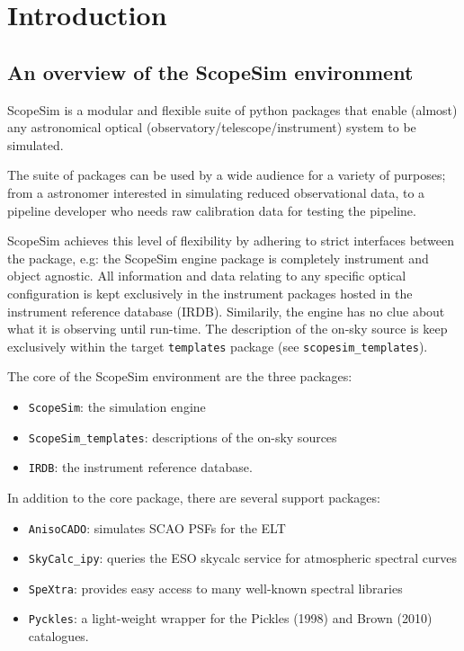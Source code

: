 

\section{Introduction%
  \label{introduction}%
}


\subsection{An overview of the ScopeSim environment%
  \label{an-overview-of-the-scopesim-environment}%
}

ScopeSim is a modular and flexible suite of python packages that enable (almost) any astronomical optical (observatory/telescope/instrument) system to be simulated.

The suite of packages can be used by a wide audience for a variety of purposes; from a astronomer interested in simulating reduced observational data, to a pipeline developer who needs raw calibration data for testing the pipeline.


ScopeSim achieves this level of flexibility by adhering to strict interfaces between the package, e.g: the ScopeSim engine package is completely instrument and object agnostic.
All information and data relating to any specific optical configuration is kept exclusively in the instrument packages hosted in the instrument reference database (IRDB).
Similarily, the engine has no clue about what it is observing until run-time.
The description of the on-sky source is keep exclusively within the target \texttt{templates} package (see \texttt{scopesim\_templates}).

The core of the ScopeSim environment are the three packages:

\begin{itemize}
\item \texttt{ScopeSim}: the simulation engine

\item \texttt{ScopeSim\_templates}: descriptions of the on-sky sources

\item \texttt{IRDB}: the instrument reference database.
\end{itemize}

In addition to the core package, there are several support packages:

\begin{itemize}
\item \texttt{AnisoCADO}: simulates SCAO PSFs for the ELT

\item \texttt{SkyCalc\_ipy}: queries the ESO skycalc service for atmospheric spectral curves

\item \texttt{SpeXtra}: provides easy access to many well-known spectral libraries

\item \texttt{Pyckles}: a light-weight wrapper for the Pickles (1998) and Brown (2010) catalogues.
\end{itemize}

